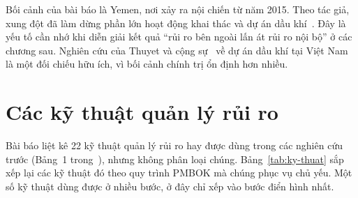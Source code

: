 Bối cảnh của bài báo là Yemen, nơi xảy ra nội chiến từ năm 2015. Theo tác giả, xung đột đã làm dừng phần lớn hoạt động khai thác và dự án dầu khí~\cite{kassem2022}. Đây là yếu tố cần nhớ khi diễn giải kết quả ``rủi ro bên ngoài lấn át rủi ro nội bộ'' ở các chương sau. Nghiên cứu của Thuyet và cộng sự~\cite{thuyet2007} về dự án dầu khí tại Việt Nam là một đối chiếu hữu ích, vì bối cảnh chính trị ổn định hơn nhiều.

\section{Các kỹ thuật quản lý rủi ro}
\label{sec:ky-thuat}

Bài báo liệt kê 22 kỹ thuật quản lý rủi ro hay được dùng trong các nghiên cứu trước (Bảng~1 trong~\cite{kassem2022}), nhưng không phân loại chúng. Bảng~\ref{tab:ky-thuat} sắp xếp lại các kỹ thuật đó theo quy trình PMBOK mà chúng phục vụ chủ yếu. Một số kỹ thuật dùng được ở nhiều bước, ở đây chỉ xếp vào bước điển hình nhất.

